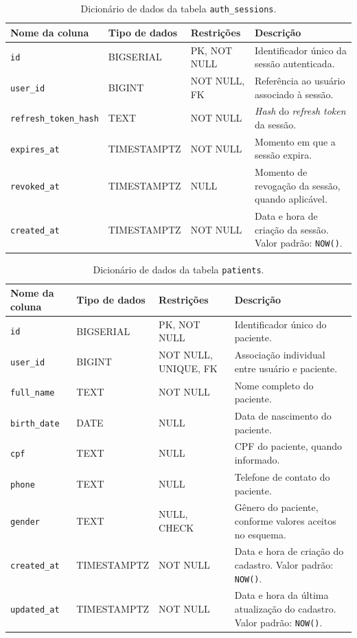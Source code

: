 \begin{apendicesenv}
\begin{table}[htb]
\centering
\small
\caption{Dicionário de dados da tabela \texttt{auth\_sessions}.}
\label{tab:dd-auth-sessions}
\begin{tabularx}{\textwidth}{p{3.2cm}p{2.8cm}p{3.1cm}X}
\hline
Nome da coluna & Tipo de dados & Restrições & Descrição \\
\hline
\texttt{id} & BIGSERIAL & PK, NOT NULL & Identificador único da sessão autenticada. \\
\texttt{user\_id} & BIGINT & NOT NULL, FK & Referência ao usuário associado à sessão. \\
\texttt{refresh\_token\_hash} & TEXT & NOT NULL & \textit{Hash} do \textit{refresh token} da sessão. \\
\texttt{expires\_at} & TIMESTAMPTZ & NOT NULL & Momento em que a sessão expira. \\
\texttt{revoked\_at} & TIMESTAMPTZ & NULL & Momento de revogação da sessão, quando aplicável. \\
\texttt{created\_at} & TIMESTAMPTZ & NOT NULL & Data e hora de criação da sessão. Valor padrão: \texttt{NOW()}. \\
\hline
\end{tabularx}
\end{table}

\begin{table}[htb]
\centering
\small
\caption{Dicionário de dados da tabela \texttt{patients}.}
\label{tab:dd-patients}
\begin{tabularx}{\textwidth}{p{3.2cm}p{2.8cm}p{3.1cm}X}
\hline
Nome da coluna & Tipo de dados & Restrições & Descrição \\
\hline
\texttt{id} & BIGSERIAL & PK, NOT NULL & Identificador único do paciente. \\
\texttt{user\_id} & BIGINT & NOT NULL, UNIQUE, FK & Associação individual entre usuário e paciente. \\
\texttt{full\_name} & TEXT & NOT NULL & Nome completo do paciente. \\
\texttt{birth\_date} & DATE & NULL & Data de nascimento do paciente. \\
\texttt{cpf} & TEXT & NULL & CPF do paciente, quando informado. \\
\texttt{phone} & TEXT & NULL & Telefone de contato do paciente. \\
\texttt{gender} & TEXT & NULL, CHECK & Gênero do paciente, conforme valores aceitos no esquema. \\
\texttt{created\_at} & TIMESTAMPTZ & NOT NULL & Data e hora de criação do cadastro. Valor padrão: \texttt{NOW()}. \\
\texttt{updated\_at} & TIMESTAMPTZ & NOT NULL & Data e hora da última atualização do cadastro. Valor padrão: \texttt{NOW()}. \\
\hline
\end{tabularx}
\end{table}


\end{apendicesenv}
